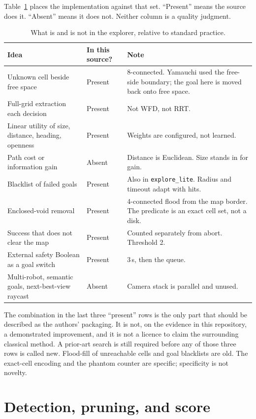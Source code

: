 \documentclass[11pt]{article}
\begin{document}
Table~\ref{tab:prior} places the implementation against that set. ``Present'' means the source does it. ``Absent'' means it does not. Neither column is a quality judgment.

\begin{table}[ht]
\centering
\caption{What is and is not in the explorer, relative to standard practice.}
\label{tab:prior}
\small
\begin{tabular}{@{}p{4.2cm}p{3.4cm}p{6.6cm}@{}}
\toprule
Idea & In this source? & Note \\
\midrule
Unknown cell beside free space & Present & 8-connected. Yamauchi used the free-side boundary; the goal here is moved back onto free space. \\
Full-grid extraction each decision & Present & Not WFD, not RRT. \\
Linear utility of size, distance, heading, openness & Present & Weights are configured, not learned. \\
Path cost or information gain & Absent & Distance is Euclidean. Size stands in for gain. \\
Blacklist of failed goals & Present & Also in \texttt{explore\_lite}. Radius and timeout adapt with hits. \\
Enclosed-void removal & Present & 4-connected flood from the map border. The predicate is an exact cell set, not a disk. \\
Success that does not clear the map & Present & Counted separately from abort. Threshold 2. \\
External safety Boolean as a goal switch & Present & 3\,s, then the queue. \\
Multi-robot, semantic goals, next-best-view raycast & Absent & Camera stack is parallel and unused. \\
\bottomrule
\end{tabular}
\end{table}

The combination in the last three ``present'' rows is the only part that should be described as the authors' packaging. It is not, on the evidence in this repository, a demonstrated improvement, and it is not a licence to claim the surrounding classical method. A prior-art search is still required before any of those three rows is called new. Flood-fill of unreachable cells and goal blacklists are old. The exact-cell encoding and the phantom counter are specific; specificity is not novelty.

\section{Detection, pruning, and score}
\end{document}
